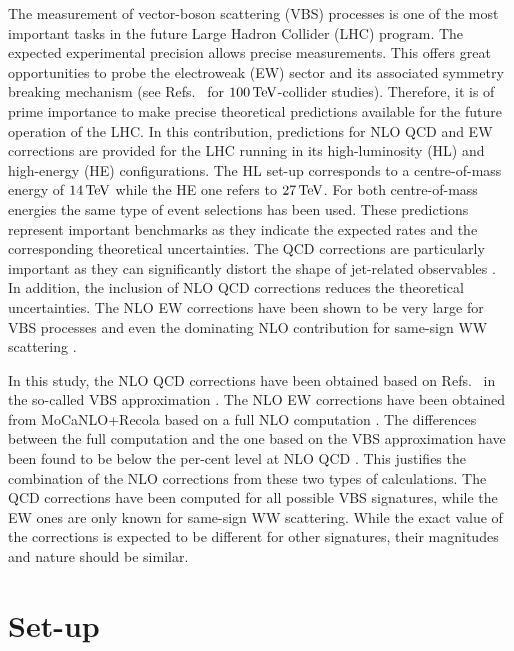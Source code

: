 \documentclass[11pt,epsf]{article}
\begin{document}
The measurement of vector-boson scattering (VBS) processes is one of
the most important tasks in the future Large Hadron Collider (LHC) program.
The expected experimental precision allows precise measurements.
This offers great opportunities to probe the electroweak (EW) sector and its associated symmetry breaking mechanism
(see Refs.~\cite{Mangano:2016jyj,Goncalves:2017gzy,Jager:2017owh} for $100\,\text{TeV}$-collider studies).
Therefore, it is of prime importance to make precise theoretical
predictions available for the future operation of the LHC.
In this contribution, predictions for NLO QCD and EW corrections are provided for the LHC running in its high-luminosity (HL) and high-energy (HE) configurations.
The HL set-up corresponds to a centre-of-mass energy of $14\,\text{TeV}$ while
the HE one refers to $27\,\text{TeV}$.
For both centre-of-mass energies the same type of event selections has been used.
These predictions represent important benchmarks as they indicate the expected rates and the corresponding theoretical uncertainties.
The QCD corrections are particularly important as they can significantly distort the shape of jet-related observables \cite{Jager:2006zc,Jager:2006cp,Bozzi:2007ur,Jager:2009xx,Jager:2011ms,Denner:2012dz,Rauch:2016pai,Biedermann:2017bss,Ballestrero:2018anz}.
In addition, the inclusion of NLO QCD corrections reduces the theoretical uncertainties.
The NLO EW corrections have been shown to be very large for VBS processes \cite{Biedermann:2016yds} and even the dominating NLO contribution for same-sign WW scattering \cite{Biedermann:2017bss}.

In this study, the NLO QCD corrections have been obtained based on Refs.~\cite{Arnold:2008rz, Arnold:2011wj, Baglio:2014uba} in the so-called VBS approximation \cite{Oleari:2003tc,Denner:2012dz,Ballestrero:2018anz}.
The NLO EW corrections have been obtained from {\sc MoCaNLO+Recola}
\cite{Bendavid:2018nar,Actis:2016mpe,Actis:2016mpe} based on a
full NLO computation \cite{Biedermann:2017bss}.
The differences between the full computation and the one based on the
VBS approximation have been found to be below the per-cent level at
NLO QCD \cite{Ballestrero:2018anz}.
This justifies the combination of the NLO corrections from these two types of calculations.
The QCD corrections have been computed for all possible VBS signatures, while the EW ones are only known for same-sign WW scattering.
While the exact value of the corrections is expected to be different
for other signatures, their magnitudes and nature should be similar.

\section{Set-up}
\end{document}
